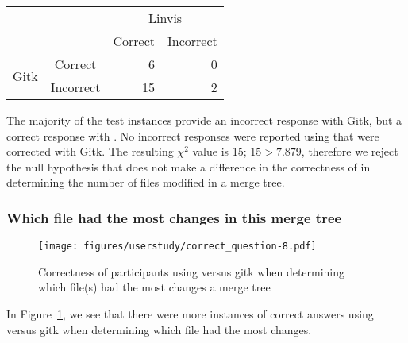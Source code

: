 

\begin{center}
  \begin{tabular}{cc|rr}
                           &           & \multicolumn{2}{c}{Linvis}\\
                           &           & Correct                      & Incorrect\\\hline
    \multirow{2}{*}{Gitk}  & Correct   & 6                            & 0\\
                           & Incorrect & 15                           & 2\\
  \end{tabular}
\end{center}

The majority of the test instances provide an incorrect response with
Gitk, but a correct response with \tool. No incorrect responses were
reported using \tool that were corrected with Gitk. The resulting
$\chi^2$ value is 15; $15 > 7.879$, therefore we reject the null
hypothesis that \tool does not make a difference in the correctness of
in determining the number of files modified in a merge tree.

\subsubsection{Which file had the most changes in this merge tree}
\label{ssub:which_file_had_the_most_changes_in_this_merge_tree}

\begin{figure}[htpb]
  \centering
  \texttt{[image: figures/userstudy/correct\_question-8.pdf]}
  \caption{Correctness of participants using \tool versus gitk when
    determining which file(s) had the most changes a merge tree}
  \label{fig:q_8_correctness}
\end{figure}

In Figure~\ref{fig:q_8_correctness}, we see that there were more
instances of correct answers using \tool versus gitk when determining
which file had the most changes.




